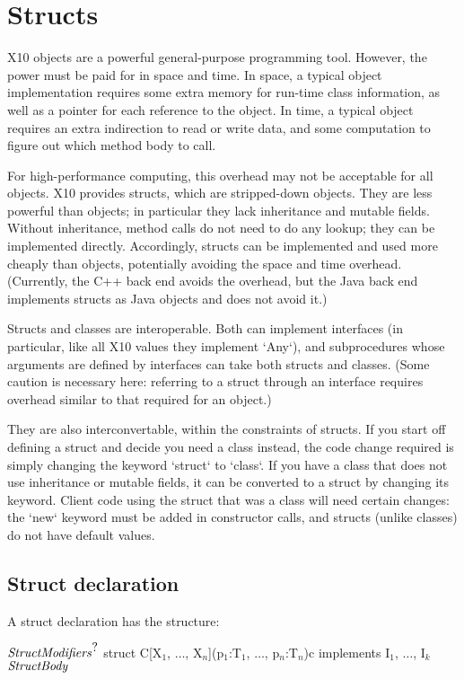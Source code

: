 \chapter{Structs}
\label{XtenStructs}
\label{StructClasses}
\label{Structs}

X10 objects are a powerful general-purpose programming tool. However, the
power must be paid for in space and time. In space, a typical object
implementation requires some extra memory for run-time class information, as
well as a pointer for each reference to the object.  In time, a typical object
requires an extra indirection to read or write data, and some computation to
figure out which method body to call.  

For high-performance computing, this overhead may not be acceptable for all
objects. X10 provides structs, which are stripped-down objects. They are less
powerful than objects; in particular they lack inheritance and mutable fields.
Without inheritance, method calls do not need to do any lookup; they can be
implemented directly. Accordingly, structs can be implemented and used more
cheaply than objects, potentially avoiding the space and time overhead.
(Currently, the C++ back end avoids the overhead, but the Java back end
implements structs as Java objects and does not avoid it.)

Structs and classes are interoperable. Both can implement interfaces (in
particular, like all X10 values they implement \xcd`Any`), and subprocedures
whose arguments are defined by interfaces can take both structs and classes.
(Some caution is necessary here: referring to a struct through an interface
requires overhead similar to that required for an object.)

They are also interconvertable, within the constraints of structs. If you
start off defining a struct and decide you need a class instead, the code
change required is simply changing the keyword \xcd`struct` to \xcd`class`. If
you have a class that does not use inheritance or mutable fields, it can be
converted to a struct by changing its keyword. Client code using the struct
that was a class will need certain changes: the \xcd`new` keyword must be
added in constructor calls, and structs (unlike classes) do not have default values.



\section{Struct declaration}
A struct declaration has the structure: 
\begin{xtenmath}
$\mbox{\emph{StructModifiers}}^{\mbox{?}}$
struct C[X$_1$, $\ldots$, X$_n$](p$_1$:T$_1$, $\ldots$, p$_n$:T$_n$){c} 
   implements I$_1$, $\ldots$, I$_k$ {
$\mbox{\emph{StructBody}}$
}
\end{xtenmath}

